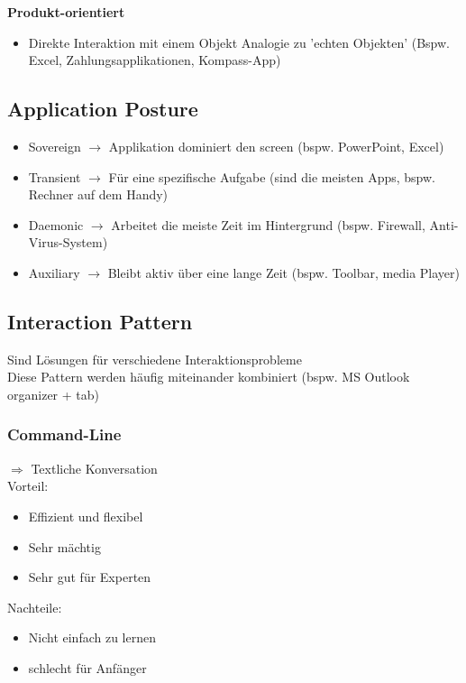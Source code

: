 \documentclass{report}
\theoremstyle{definition}
\theoremstyle{example}
\begin{document}
\textbf{Produkt-orientiert}
\begin{itemize}
   \item Direkte Interaktion mit einem Objekt
   \subitem Analogie zu 'echten Objekten' (Bspw. Excel, Zahlungsapplikationen, Kompass-App)
\end{itemize}

\subsection{Application Posture}
\begin{itemize}
   \item Sovereign $\rightarrow$ Applikation dominiert den screen (bspw. PowerPoint, Excel)
   \item Transient $\rightarrow$ Für eine spezifische Aufgabe (sind die meisten Apps, bspw. Rechner auf dem Handy)
   \item Daemonic $\rightarrow$ Arbeitet die meiste Zeit im Hintergrund (bspw. Firewall, Anti-Virus-System)
   \item Auxiliary $\rightarrow$ Bleibt aktiv über eine lange Zeit (bspw. Toolbar, media Player)
\end{itemize}

\subsection{Interaction Pattern}
Sind Lösungen für verschiedene Interaktionsprobleme\\
Diese Pattern werden häufig miteinander kombiniert (bspw. MS Outlook organizer + tab)

\subsubsection{Command-Line}
$\Rightarrow$ Textliche Konversation\\
Vorteil: 
\begin{itemize}
   \item Effizient und flexibel
   \item Sehr mächtig
   \item Sehr gut für Experten
\end{itemize}
Nachteile:
\begin{itemize}
   \item Nicht einfach zu lernen
   \item schlecht für Anfänger
\end{itemize}
\end{document}

